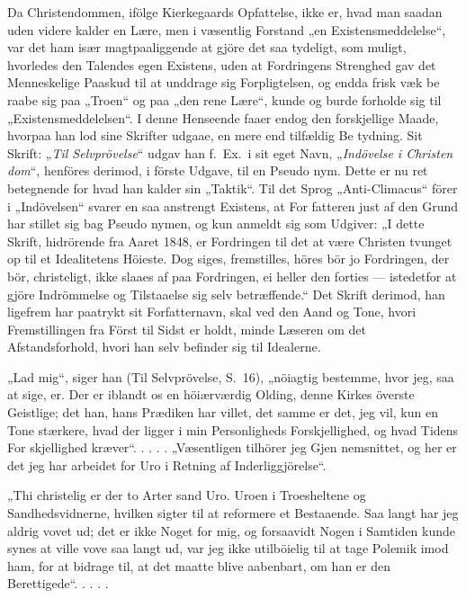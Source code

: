 \documentclass[12pt,a4paper]{article}
\newcommand{\opage}[1]{\marginnote{\footnotesize\textit{[#1]}}}
\begin{document}
Da Christendommen, ifölge Kierkegaards Opfattelse,
ikke er, hvad man saadan uden videre kalder en Lære,
men i væsentlig Forstand „en Existensmeddelelse“, var
det ham især magtpaaliggende at gjöre det saa tydeligt,
som muligt, hvorledes den Talendes egen Existens, uden
at Fordringens Strenghed gav det Menneskelige Paaskud
til at unddrage sig Forpligtelsen, og endda frisk væk be\-%
raabe sig paa „Troen“ og paa „den rene Lære“, kunde
og burde forholde sig til „Existensmeddelelsen“. I denne
Henseende faaer endog den forskjellige Maade, hvorpaa
han lod sine Skrifter udgaae, en mere end tilfældig Be\-%
tydning. Sit Skrift: „\emph{Til Selvprövelse}“ udgav han
f.\ Ex.\ i sit eget Navn, „\emph{Indövelse i Christen\-%
dom}“, henföres derimod, i förste Udgave, til en Pseudo\-%
nym. Dette er nu ret betegnende for hvad han kalder
sin „Taktik“. Til det Sprog „Anti-Climacus“ förer i
\opage{15} %
„Indövelsen“ svarer en saa anstrengt Existens, at For\-%
fatteren just af den Grund har stillet sig bag Pseudo\-%
nymen, og kun anmeldt sig som Udgiver: „I dette
Skrift, hidrörende fra Aaret 1848, er Fordringen til det
at være Christen tvunget op til et Idealitetens Höieste.
Dog siges, fremstilles, höres bör jo Fordringen, der bör,
christeligt, ikke slaaes af paa Fordringen, ei heller den
forties --- istedetfor at gjöre Indrömmelse og Tilstaaelse
sig selv betræffende.“ Det Skrift derimod, han ligefrem
har paatrykt sit Forfatternavn, skal ved den Aand og
Tone, hvori Fremstillingen fra Först til Sidst er holdt,
minde Læseren om det Afstandsforhold, hvori han selv
befinder sig til Idealerne.

„Lad mig“, siger han (Til Selvprövelse, S.\ 16),
„nöiagtig bestemme, hvor jeg, saa at sige, er. Der er
iblandt os en höiærværdig Olding, denne Kirkes överste
Geistlige; det han, hans Prædiken har villet, det samme
er det, jeg vil, kun en Tone stærkere, hvad der ligger
i min Personligheds Forskjellighed, og hvad Tidens For\-%
skjellighed kræver“. . . . . „Væsentligen tilhörer jeg Gjen\-%
nemsnittet, og her er det jeg har arbeidet for Uro i
Retning af Inderliggjörelse“.

„Thi christelig er der to Arter sand Uro. Uroen i
Troesheltene og Sandhedsvidnerne, hvilken sigter til at
reformere et Bestaaende. Saa langt har jeg aldrig vovet
ud; det er ikke Noget for mig, og forsaavidt Nogen i
Samtiden kunde synes at ville vove saa langt ud, var
jeg ikke utilböielig til at tage Polemik imod ham, for at
bidrage til, at det maatte blive aabenbart, om han er
den Berettigede“. . . . .
\end{document}
